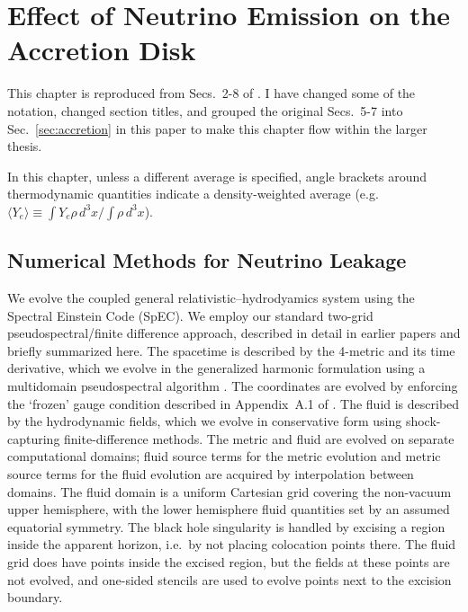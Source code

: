 \chapter{Effect of Neutrino Emission on the Accretion Disk}
\label{chap:leakage}

This chapter is reproduced from Secs.~2-8 of \citealt{deat2013-leakage}.
I have changed some of the notation, changed section titles, and grouped
the original Secs.~5-7 into Sec.~\ref{sec:accretion} in this paper to make this
chapter flow within the larger thesis.

In this chapter, unless a different average is specified, angle brackets around
thermodynamic quantities indicate a density-weighted average
(e.g.\ $\langle Y_e \rangle \equiv \int Y_e \rho\, d^3x/ \int \rho\, d^3x$).

\section{Numerical Methods for Neutrino Leakage}
\label{sec:Methods}

We evolve the coupled general relativistic--hydrodyamics system using
the Spectral Einstein Code (SpEC).
We employ our standard two-grid pseudospectral/finite difference approach,
described in detail in earlier papers
\citep{sche2006-dual_frames,duez2008-first_spec_bhns,hemb2012-dynamical_excision,fouc2013-compactness_and_spin}
and briefly summarized here. The spacetime is described by the 4-metric and
its time derivative, which we evolve in the generalized harmonic formulation using a multidomain
pseudospectral algorithm \citep{lind2007-gen_harmonic}.
The coordinates are evolved by enforcing the `frozen' gauge condition described
in Appendix~A.1 of \cite{fouc2013-compactness_and_spin}.
The fluid is described by the hydrodynamic fields,
which we evolve in conservative form using shock-capturing finite-difference
methods.  The metric and fluid are evolved on separate computational domains;
fluid source terms for the metric evolution and metric source terms for the
fluid evolution are acquired by interpolation between domains.  The fluid
domain is a uniform Cartesian grid covering the non-vacuum upper hemisphere,
with the lower hemisphere fluid quantities set by an assumed equatorial
symmetry. The black hole singularity is handled by excising
a region inside the apparent horizon, i.e.\ by not placing colocation points
there.  The fluid grid does have points inside the excised region, but the fields
at these points are not evolved, and one-sided stencils are used to evolve points next
to the excision boundary.

